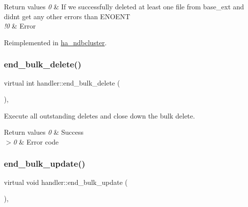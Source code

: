 \begin{DoxyRetVals}{Return values}
{\em 0} & If we successfully deleted at least one file from base\+\_\+ext and didn\textquotesingle{}t get any other errors than E\+N\+O\+E\+NT \\
\hline
{\em !0} & Error \\
\hline
\end{DoxyRetVals}


Reimplemented in \mbox{\hyperlink{classha__ndbcluster_a4d32721908372dc62c490e14a005e03c}{ha\+\_\+ndbcluster}}.

\mbox{\label{classhandler_af5f9f1ca2b5efc0b41e96c6b793d9bb1}} 
\subsubsection{\texorpdfstring{end\+\_\+bulk\+\_\+delete()}{end\_bulk\_delete()}}
{\footnotesize\ttfamily virtual int handler\+::end\+\_\+bulk\+\_\+delete (\begin{DoxyParamCaption}{ }\end{DoxyParamCaption})\hspace{0.3cm}{\ttfamily [inline]}, {\ttfamily [virtual]}}

Execute all outstanding deletes and close down the bulk delete.


\begin{DoxyRetVals}{Return values}
{\em 0} & Success \\
\hline
{\em $>$0} & Error code \\
\hline
\end{DoxyRetVals}
\mbox{\label{classhandler_a2bf6c46d66ca282a4cbd6118e4c99e03}} 
\subsubsection{\texorpdfstring{end\+\_\+bulk\+\_\+update()}{end\_bulk\_update()}}
{\footnotesize\ttfamily virtual void handler\+::end\+\_\+bulk\+\_\+update (\begin{DoxyParamCaption}{ }\end{DoxyParamCaption})\hspace{0.3cm}{\ttfamily [inline]}, {\ttfamily [virtual]}}

